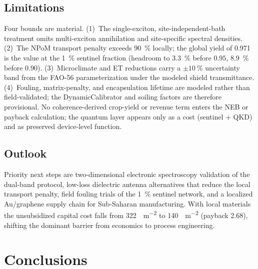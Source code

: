 \documentclass[preprint,12pt]{elsarticle}
\begin{document}
\subsection{Limitations}
Four bounds are material. (1)~The single-exciton, site-independent-bath treatment omits multi-exciton annihilation and site-specific spectral densities. (2)~The NPoM transport penalty exceeds \qty{90}{\percent} locally; the global yield of \num{0.971} is the value at the \qty{1}{\percent} sentinel fraction (headroom to \qty{3.3}{\percent} before $0.95$, \qty{8.9}{\percent} before $0.90$). (3)~Microclimate and ET reductions carry a $\pm\qty{10}{\percent}$ uncertainty band from the FAO-56 parameterization under the modeled shield transmittance. (4)~Fouling, matrix-penalty, and encapsulation lifetime are modeled rather than field-validated; the DynamicCalibrator and soiling factors are therefore provisional. No coherence-derived crop-yield or revenue term enters the NEB or payback calculation; the quantum layer appears only as a cost (sentinel + QKD) and as preserved device-level function.

\subsection{Outlook}
Priority next steps are two-dimensional electronic spectroscopy validation of the dual-band protocol, low-loss dielectric antenna alternatives that reduce the local transport penalty, field fouling trials of the \qty{1}{\percent} sentinel network, and a localized Au/graphene supply chain for Sub-Saharan manufacturing. With local materials the unsubsidized capital cost falls from \qty{322}{\USD\per\m\squared} to \qty{140}{\USD\per\m\squared} (payback \qty{2.68}{\yr}), shifting the dominant barrier from economics to process engineering.

\section{Conclusions}
\end{document}
